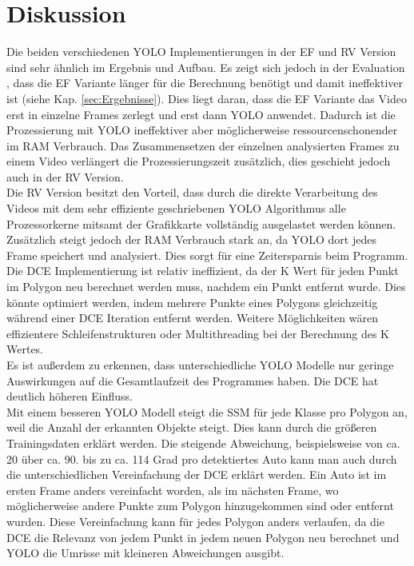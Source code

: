 \chapter{Diskussion}
\label{ch:Diskussion}
{
	Die beiden verschiedenen YOLO Implementierungen in der EF und RV Version sind sehr ähnlich im Ergebnis und Aufbau. Es zeigt sich jedoch in der Evaluation , dass die EF Variante länger für die Berechnung benötigt und damit ineffektiver ist (siehe Kap. \ref{sec:Ergebnisse}). Dies liegt daran, dass die EF Variante das Video erst in einzelne Frames zerlegt und erst dann YOLO anwendet. Dadurch ist die Prozessierung mit YOLO ineffektiver aber möglicherweise ressourcenschonender im RAM Verbrauch.  Das Zusammensetzen der einzelnen analysierten Frames zu einem Video verlängert die Prozessierungszeit zusätzlich, dies geschieht jedoch auch in der RV Version. \\
	Die RV Version besitzt den Vorteil, dass durch die direkte Verarbeitung des Videos mit dem sehr effiziente geschriebenen YOLO Algorithmus alle Prozessorkerne mitsamt der Grafikkarte vollständig ausgelastet werden können. Zusätzlich steigt jedoch der RAM Verbrauch stark an, da YOLO dort jedes Frame speichert und analysiert. Dies sorgt für eine Zeitersparnis beim Programm. \\ 
	Die DCE Implementierung ist relativ ineffizient, da der K Wert für jeden Punkt im Polygon neu berechnet werden muss, nachdem ein Punkt entfernt wurde. Dies könnte optimiert werden, indem mehrere Punkte eines Polygons gleichzeitig während einer DCE Iteration entfernt werden. Weitere Möglichkeiten wären effizientere Schleifenstrukturen oder Multithreading bei der Berechnung des K Wertes. \\
	Es ist außerdem zu erkennen, dass unterschiedliche YOLO Modelle nur geringe Auswirkungen auf die Gesamtlaufzeit des Programmes haben. Die DCE hat deutlich höheren Einfluss. \\
	
	Mit einem besseren YOLO Modell steigt die SSM für jede Klasse pro Polygon an, weil die Anzahl der erkannten Objekte steigt. Dies kann durch die größeren Trainingsdaten erklärt werden. Die steigende Abweichung, beispielsweise von ca. 20 über ca. 90. bis zu ca. 114 Grad pro detektiertes Auto kann man auch durch die unterschiedlichen Vereinfachung der DCE erklärt werden. Ein Auto ist im ersten Frame anders vereinfacht worden, als im nächsten Frame, wo möglicherweise andere Punkte zum Polygon hinzugekommen sind oder entfernt wurden. Diese Vereinfachung kann für jedes Polygon anders verlaufen, da die DCE die Relevanz von jedem Punkt in jedem neuen Polygon neu berechnet und YOLO die Umrisse mit kleineren Abweichungen ausgibt.

}
